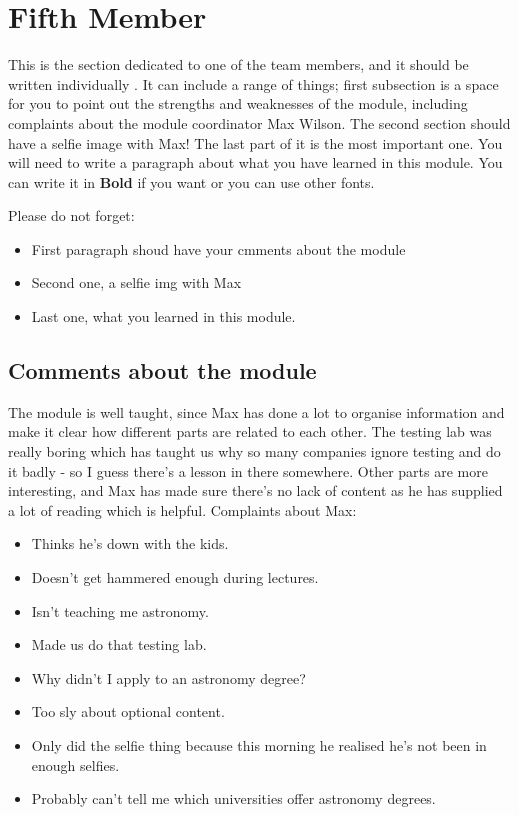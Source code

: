 \section{Fifth Member}
This is the section dedicated to one of the team members, and it should be written individually . It can include a range of things; first subsection is a space for you to point out the strengths and weaknesses of the module, including complaints about the module coordinator Max Wilson. The second section should have a selfie image with Max! The last part of it is the most important one. You will need to write a paragraph about what you have learned in this module. You can write it in \textbf{Bold} if you want or you can use other fonts. 

Please do not forget:
\begin{itemize}
	\item First paragraph shoud have your cmments about the module
	\item Second one, a selfie img with Max
	\item Last one, what you learned in this module.
\end{itemize}

\subsection{Comments about the module}
The module is well taught, since Max has done a lot to organise information and make it clear how different parts are related to each other. The testing lab was really boring which has taught us why so many companies ignore testing and do it badly - so I guess there's a lesson in there somewhere. Other parts are more interesting, and Max has made sure there's no lack of content as he has supplied a lot of reading which is helpful. Complaints about Max:
\begin{itemize}
	\item Thinks he's down with the kids.
	\item Doesn't get hammered enough during lectures.
	\item Isn't teaching me astronomy.
	\item Made us do that testing lab.
	\item Why didn't I apply to an astronomy degree?
	\item Too sly about optional content.
	\item Only did the selfie thing because this morning he realised he's not been in enough selfies.
	\item Probably can't tell me which universities offer astronomy degrees.
\end{itemize}

